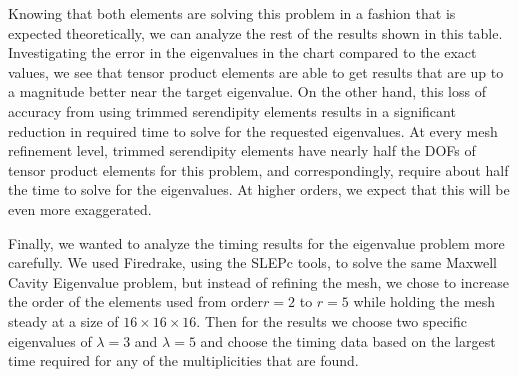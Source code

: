 \documentclass[format=acmsmall,screen,timestamp=false,a4paper]{acmart}
\begin{document}
Knowing that both elements are solving this problem in a fashion that is expected theoretically, we can analyze the rest of the results shown in this table.  Investigating the error in the eigenvalues in the chart compared to the exact values, we see that tensor product elements are able to get results that are up to a magnitude better near the target eigenvalue.  On the other hand, this loss of accuracy from using trimmed serendipity elements results in a significant reduction in required time to solve for the requested eigenvalues.  At every mesh refinement level, trimmed serendipity elements have nearly half the DOFs of tensor product elements for this problem, and correspondingly, require about half the time to solve for the eigenvalues.  At higher orders, we expect that this will be even more exaggerated.  

Finally, we wanted to analyze the timing results for the eigenvalue problem more carefully.  We used Firedrake, using the SLEPc tools, to solve the same Maxwell Cavity Eigenvalue problem, but instead of refining the mesh, we chose to increase the order of the elements used from order$r=2$ to $r=5$ while holding the mesh steady at a size of $16 \times 16 \times 16$.  Then for the results we choose two specific eigenvalues of $\lambda = 3$ and $\lambda = 5$ and choose the timing data based on the largest time required for any of the multiplicities that are found. 
\end{document}
